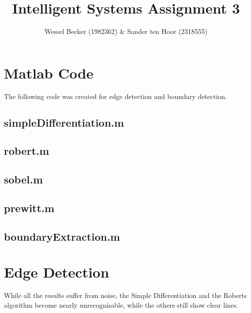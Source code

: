 \documentclass[10pt,a4paper]{article}
\begin{document}
\title{Intelligent Systems Assignment 3}
\author{Wessel Becker (1982362) \& Sander ten Hoor (2318555)}
\maketitle

\section{Matlab Code}
The following code was created for edge detection and boundary detection.

\subsection{simpleDifferentiation.m}


\subsection{robert.m}


\subsection{sobel.m}


\subsection{prewitt.m}


%

\subsection{boundaryExtraction.m}\label{list:boundaryExtraction}


\section{Edge Detection}
While all the results suffer from noise, the Simple Differentiation and the Roberts algorithm become nearly unrecognisable, while the others still show clear lines.
\end{document}
